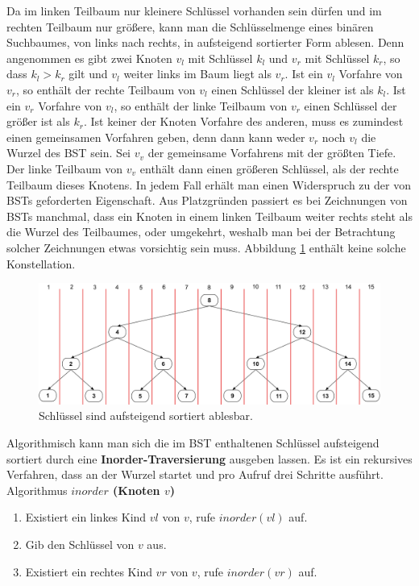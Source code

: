 \documentclass[a4paper,12pt]{article}
\begin{document}
\noindent Da im linken Teilbaum nur kleinere Schlüssel vorhanden sein dürfen und im rechten Teilbaum nur größere, kann man die Schlüsselmenge eines binären Suchbaumes, von links nach rechts, in aufsteigend sortierter Form ablesen. Denn angenommen es gibt zwei Knoten $v_l$ mit Schlüssel $k_l$ und $v_r$ mit Schlüssel $k_r$, so dass $k_l > k_r$ gilt und $v_l$ weiter links im Baum liegt als $v_r$. Ist ein $v_l$ Vorfahre von $v_r$, so enthält der rechte Teilbaum von $v_l$ einen Schlüssel der kleiner ist als $k_l$. Ist ein $v_r$ Vorfahre von $v_l$, so enthält der linke Teilbaum von $v_r$ einen Schlüssel der größer ist als $k_r$. Ist keiner der Knoten Vorfahre des anderen, muss es zumindest einen gemeinsamen Vorfahren geben, denn dann kann weder $v_r$ noch $v_l$ die Wurzel des BST sein. Sei $v_v$ der gemeinsame Vorfahrens mit der größten Tiefe. Der linke Teilbaum von $v_v$ enthält dann einen größeren Schlüssel, als der rechte Teilbaum dieses Knotens. In jedem Fall erhält man einen Widerspruch zu der von BSTs geforderten Eigenschaft. Aus Platzgründen passiert es bei Zeichnungen von BSTs manchmal, dass ein Knoten in einem linken Teilbaum weiter rechts steht als die Wurzel des Teilbaumes, oder umgekehrt, weshalb man bei der Betrachtung solcher Zeichnungen etwas vorsichtig sein muss. Abbildung \ref{fig:linksRechts} enthält keine solche Konstellation.  

\begin{figure}[h]
	\centering
	\includegraphics[width= 1\textwidth]{"Medien/Einleitung/linksRechts"}
	\caption{Schlüssel sind aufsteigend sortiert ablesbar. }
	\label{fig:linksRechts}
\end{figure}
\noindent Algorithmisch kann man sich die im BST enthaltenen Schlüssel aufsteigend sortiert durch eine \textbf{Inorder-Traversierung} ausgeben lassen. Es ist ein rekursives Verfahren, dass an der Wurzel startet und pro Aufruf drei Schritte ausführt.\\

Algorithmus \textbf{$\mathit{inorder}$ (Knoten $v$)}
\begin{enumerate}
	\item Existiert ein linkes Kind $\mathit{vl}$ von $v$, rufe $\mathit{inorder(vl)}$ auf. 
	\item Gib den Schlüssel von $v$ aus. 
	\item Existiert ein rechtes Kind $\mathit{vr}$ von $v$, rufe $\mathit{inorder(vr)}$ auf. 
\end{enumerate}
\end{document}
